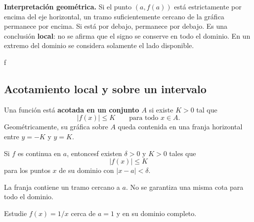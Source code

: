 \documentclass[10pt,a5paper]{article}
\newif\ifmostrarSoluciones
\begin{document}
\textbf{Interpretación geométrica.} Si el punto $(a,f(a))$ está estrictamente por encima del eje horizontal, un tramo suficientemente cercano de la gráfica permanece por encima. Si está por debajo, permanece por debajo. Es una conclusión \textbf{local}: no se afirma que el signo se conserve en todo el dominio. En un extremo del dominio se considera solamente el lado disponible.

\begin{center}
\end{center}f

\subsection*{Acotamiento local y sobre un intervalo}

\begin{definicion}[acotamiento]
Una función está \textbf{acotada en un conjunto $A$} si existe $K>0$ tal que
\[
  |f(x)|\leq K\qquad\text{para todo }x\in A.
\]
Geométricamente, su gráfica sobre $A$ queda contenida en una franja horizontal entre $y=-K$ y $y=K$.
\end{definicion}

\begin{teorema}
Si $f$ es continua en $a$, entoncesf existen $\delta>0$ y $K>0$ tales que
\[
  |f(x)|\leq K
\]
para los puntos $x$ de su dominio con $|x-a|<\delta$.
\end{teorema}

La franja contiene un tramo cercano a $a$. No se garantiza una misma cota para todo el dominio.

\begin{ejemplo}
Estudie $f(x)=1/x$ cerca de $a=1$ y en su dominio completo.
\end{ejemplo}
\ifmostrarSoluciones
\begin{solucion}
Es continua en $1$. Si $|x-1|<1/2$, entonces $1/2<x<3/2$ y $|1/x|<2$. Así, $K=2$ es una cota válida en ese entorno. Sin embargo, en $\mathbb{R}\setminus\{0\}$ los valores no están acotados, porque $1/x\to+\infty$ cuando $x\to0^+$.
\end{solucion}
\else\vspace{18mm}\fi
\end{document}
